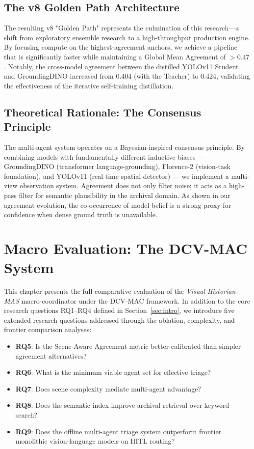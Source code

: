 \documentclass[12pt,onecolumn,a4paper]{IEEEtran}
\begin{document}
\subsection{The v8 Golden Path Architecture}
The resulting v8 "Golden Path" represents the culmination of this research—a shift from exploratory ensemble research to a high-throughput production engine. By focusing compute on the highest-agreement anchors, we achieve a pipeline that is significantly faster while maintaining a Global Mean Agreement of $>0.47$. Notably, the cross-model agreement between the distilled YOLOv11 Student and GroundingDINO increased from 0.404 (with the Teacher) to 0.424, validating the effectiveness of the iterative self-training distillation.

\subsection{Theoretical Rationale: The Consensus Principle}
The multi-agent system operates on a Bayesian-inspired consensus principle. By combining models with fundamentally different inductive biases --- GroundingDINO (transformer language-grounding), Florence-2 (vision-task foundation), and YOLOv11 (real-time spatial detector) --- we implement a multi-view observation system. Agreement does not only filter noise; it acts as a high-pass filter for semantic plausibility in the archival domain. As shown in our agreement evolution, the co-occurrence of model belief is a strong proxy for confidence when dense ground truth is unavailable.

\clearpage
\section{Macro Evaluation: The DCV-MAC System}
\label{sec:extended_eval}

This chapter presents the full comparative evaluation of the \textit{Visual Historian-MAS} macro-coordinator under the DCV-MAC framework. In addition to the core research questions RQ1--RQ4 defined in Section~\ref{sec:intro}, we introduce five extended research questions addressed through the ablation, complexity, and frontier comparison analyses:
\begin{itemize}
    \item \textbf{RQ5}: Is the Scene-Aware Agreement metric better-calibrated than simpler agreement alternatives?
    \item \textbf{RQ6}: What is the minimum viable agent set for effective triage?
    \item \textbf{RQ7}: Does scene complexity mediate multi-agent advantage?
    \item \textbf{RQ8}: Does the semantic index improve archival retrieval over keyword search?
    \item \textbf{RQ9}: Does the offline multi-agent triage system outperform frontier monolithic vision-language models on HITL routing?
\end{itemize}
\end{document}
